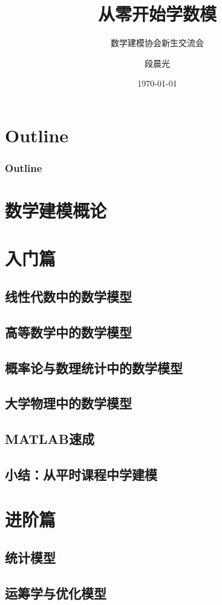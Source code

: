 \documentclass{beamer}
\title{从零开始学数模}
\subtitle{数学建模协会新生交流会}
\author{段晨光}
\institute{数学与统计学院2016级信息与计算科学专业}
\date{\today}
\begin{document}
\begin{frame}
	\titlepage
\end{frame}

\section*{Outline}
\begin{frame}
	\frametitle{Outline}
	\tableofcontents%
\end{frame}

\section{数学建模概论}
\section{入门篇}
	\subsection{线性代数中的数学模型}
	\subsection{高等数学中的数学模型}
	\subsection{概率论与数理统计中的数学模型}
	\subsection{大学物理中的数学模型}
	\subsection{MATLAB速成}
	\subsection{小结：从平时课程中学建模}
\section{进阶篇}
	\subsection{统计模型}
	\subsection{运筹学与优化模型}
\end{document}
